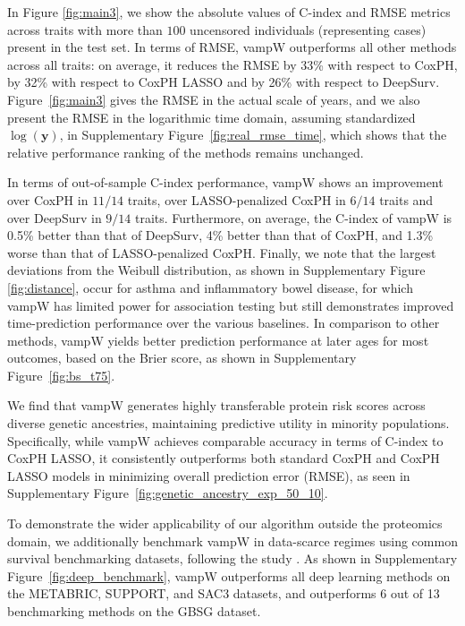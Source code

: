 In Figure \ref{fig:main3}, we show the absolute values of C-index and RMSE metrics across traits with more than $100$ uncensored individuals (representing cases) present in the test set. In terms of RMSE, vampW outperforms all other methods across all traits: on average, it reduces the RMSE by 33\% with respect to CoxPH, by 32\% with respect to CoxPH LASSO and by 26\% with respect to DeepSurv. Figure~\ref{fig:main3} gives the RMSE in the actual scale of years, and we also present the RMSE in the logarithmic time domain, assuming standardized $\log(\bm{y})$, in Supplementary Figure~\ref{fig:real_rmse_time}, which shows that the relative performance ranking of the methods remains unchanged.

In terms of out-of-sample C-index performance, vampW shows an improvement over CoxPH in $11/14$ traits, over LASSO-penalized CoxPH in $6/14$ traits and over DeepSurv in $9/14$ traits. Furthermore, on average, the C-index of vampW is 0.5\% better than that of DeepSurv, 4\% better than that of CoxPH, and 1.3\% worse than that of LASSO-penalized CoxPH. Finally, we note that the largest deviations from the Weibull distribution, as shown in Supplementary Figure \ref{fig:distance}, occur for asthma and inflammatory bowel disease, for which vampW has limited power for association testing but still demonstrates improved time-prediction performance over the various baselines. In comparison to other methods, vampW yields better prediction performance at later ages for most outcomes, based on the Brier score, as shown in Supplementary Figure~\ref{fig:bs_t75}.

We find that vampW generates highly transferable protein risk scores across diverse genetic ancestries, maintaining predictive utility in minority populations. Specifically, while vampW achieves comparable accuracy in terms of C-index to CoxPH LASSO, it consistently outperforms both standard CoxPH and CoxPH LASSO models in minimizing overall prediction error (RMSE), as seen in Supplementary Figure~\ref{fig:genetic_ancestry_exp_50_10}.

To demonstrate the wider applicability of our algorithm outside the proteomics domain, we additionally benchmark vampW in data-scarce regimes using common survival benchmarking datasets, following the study \cite{monod_neuralsurv_2025}. As shown in Supplementary Figure~\ref{fig:deep_benchmark}, vampW outperforms all deep learning methods on the METABRIC, SUPPORT, and SAC3 datasets, and outperforms 6 out of 13 benchmarking methods on the GBSG dataset. 

